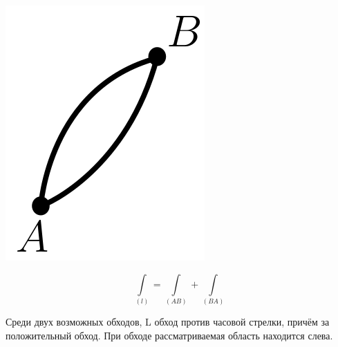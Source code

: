 \documentclass[12pt]{article}
\let\ORIincludegraphics\includegraphics
\renewcommand{\includegraphics}[2][]{\ORIincludegraphics[scale=0.65,#1]{#2}}
\let\oldint\int
\renewcommand{\int}{\oldint\limits}
\begin{document}
  \begin{minipage}{0.45\textwidth}
    \includegraphics[scale=0.6]{8.4.2.png}
  \end{minipage}
  \hspace{1em}
  \begin{minipage}{0.25\textwidth}
    \[\int_{(l)}=\int_{(AB)}+\int_{(BA)}\]
  \end{minipage}
  \vspace{1em}
  \par
  Среди двух возможных обходов, L обход против часовой стрелки, причём за положительный обход. При обходе рассматриваемая область
  находится слева.
\end{document}
